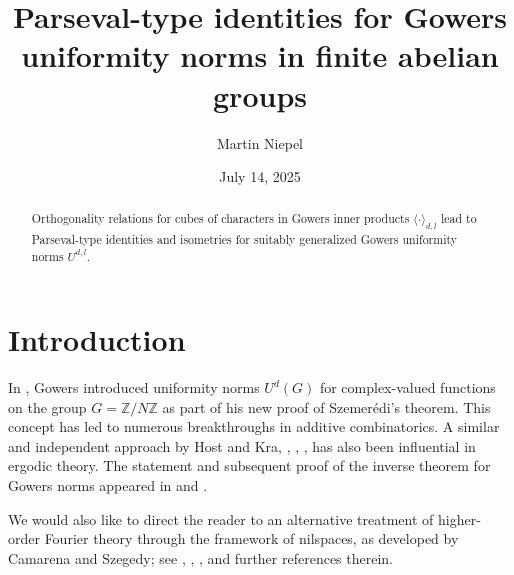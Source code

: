 \documentclass{amsart}
\theoremstyle{definition}
\theoremstyle{remark}
\numberwithin{equation}{section}
\begin{document}
\title[Parseval identities for Gowers norms]{Parseval-type identities for  Gowers \\ uniformity norms in finite abelian groups}

\author{Martin Niepel}
\address{Faculty of Mathematics, Physics, and Informatics, Comenius University,  48 Bratislava, Slovakia}


\date{July 14, 2025} %



\begin{abstract}
Orthogonality relations for cubes of characters in Gowers inner products $\langle \cdot \rangle_{d,l}$ lead to
Parseval-type identities and isometries for suitably generalized Gowers uniformity norms $U^{d,l}$.  
\end{abstract}


\maketitle

\section{Introduction}
\label{sec:intro}

In \cite{Gow01}, Gowers introduced uniformity norms $U^d(G)$ for complex-valued functions on the group
$G=\mathbb{Z}/N\mathbb{Z}$ as part of his new proof of Szemer\'edi's theorem. This concept has led to numerous breakthroughs in additive combinatorics. A similar and independent approach by Host and Kra, \cite{HoKr04}, \cite{HoKr05}, \cite{HoKr08}, 
has also been influential in ergodic theory. The statement and subsequent proof of the inverse theorem for Gowers norms appeared in \cite{GrTa08} and \cite{GrTaZi12}. 

We would also like to direct the reader to an alternative treatment of higher-order Fourier theory through the framework of nilspaces, as developed by Camarena and Szegedy; see \cite{CamSze10}, \cite{Szeg12}, \cite{Can16}, and further references therein. 
\end{document}
